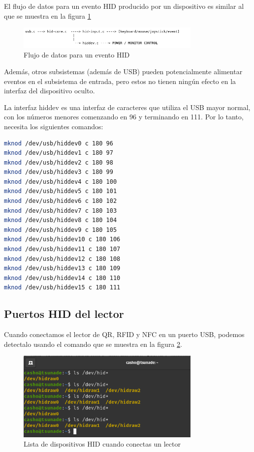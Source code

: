 El flujo de datos para un evento HID producido por un dispositivo es similar al que se muestra en la figura \ref{cap2:005}

\begin{figure}[htb]
\centering
\includegraphics[width=0.8\textwidth]{capitulo2/hid_seq.png}
\caption{Flujo de datos para un evento HID}
\label{cap2:005}
\end{figure}

Además, otros subsistemas (además de USB) pueden potencialmente alimentar eventos en el subsistema de entrada, pero estos no tienen ningún efecto en la interfaz del dispositivo oculto.

La interfaz hiddev es una interfaz de caracteres que utiliza el USB mayor normal, con los números menores comenzando en 96 y terminando en 111. Por lo tanto, necesita los siguientes comandos:

\begin{lstlisting}[language=bash]
mknod /dev/usb/hiddev0 c 180 96
mknod /dev/usb/hiddev1 c 180 97
mknod /dev/usb/hiddev2 c 180 98
mknod /dev/usb/hiddev3 c 180 99
mknod /dev/usb/hiddev4 c 180 100
mknod /dev/usb/hiddev5 c 180 101
mknod /dev/usb/hiddev6 c 180 102
mknod /dev/usb/hiddev7 c 180 103
mknod /dev/usb/hiddev8 c 180 104
mknod /dev/usb/hiddev9 c 180 105
mknod /dev/usb/hiddev10 c 180 106
mknod /dev/usb/hiddev11 c 180 107
mknod /dev/usb/hiddev12 c 180 108
mknod /dev/usb/hiddev13 c 180 109
mknod /dev/usb/hiddev14 c 180 110
mknod /dev/usb/hiddev15 c 180 111
\end{lstlisting}

\subsection{Puertos HID del lector}

Cuando conectamos el lector de QR, RFID y NFC en un puerto USB, podemos detectalo usando el comando que se muestra en la figura \ref{cap2:006}.

\begin{figure}[htb]
\centering
\includegraphics[width=0.8\textwidth]{capitulo2/listaHID.png}
\caption{Lista de dispositivos HID cuando conectas un lector}
\label{cap2:006}
\end{figure}

